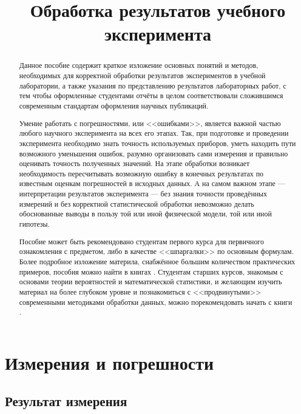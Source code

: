 \documentclass[10pt]{article}
\begin{document}
\title{Обработка результатов учебного эксперимента}
\begin{abstract}
    Данное пособие содержит краткое изложение основных понятий и методов,
    необходимых для корректной обработки результатов экспериментов в учебной
    лаборатории, а также указания по представлению результатов лабораторных
    работ, с тем чтобы оформленные студентами отчёты в целом соответствовали
    сложившимся современным стандартам оформления научных публикаций.
    
    Умение работать с погрешностями, или <<ошибками>>,
    является важной частью любого научного эксперимента на всех его этапах.
    Так, при подготовке и проведении эксперимента необходимо знать точность
    используемых приборов, уметь находить пути возможного уменьшения ошибок,
    разумно организовать сами измерения и правильно оценивать точность
    полученных значений. На этапе обработки возникает необходимость пересчитывать
    возможную ошибку в конечных результатах по известным оценкам погрешностей
    в исходных данных. А на самом важном этапе --- интерпретации
    результатов эксперимента --- без знания точности проведённых
    измерений и без корректной статистической обработки невозможно делать
    обоснованные выводы в пользу той или иной физической модели, той или
    иной гипотезы. 
    
    Пособие может быть рекомендовано студентам первого курса для первичного
    ознакомления с предметом, либо в качестве <<шпаргалки>>
    по основным формулам. Более подробное изложение материла, снабжённое
    большим количеством практических примеров, пособия можно найти в книгах
    \cite{taylor,squires,zaidel}. Студентам старших курсов, знакомым
    с основами теории вероятностей и математической статистики, и желающим
    изучить материал на более глубоком уровне и познакомиться с <<продвинутыми>>
    современными методиками обработки данных, можно порекомендовать начать
    с книги \cite{hudson}.
\end{abstract}

\maketitle
\tableofcontents

\section{Измерения и погрешности}

\subsection{Результат измерения}
\end{document}

